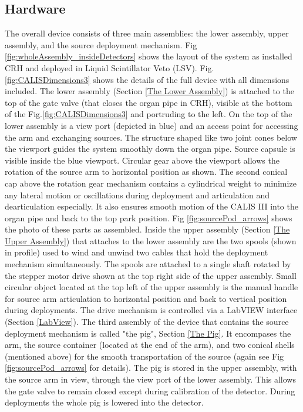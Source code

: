 \subsection{Hardware}

The overall device consists of three main assemblies: the lower assembly, upper assembly, and the source deployment mechanism. Fig \ref{fig:wholeAssembly_insideDetectors} shows the layout of the system as installed CRH and deployed in Liquid Scintillator Veto (LSV). Fig. \ref{fig:CALISDimensions3} shows the details of the full device with all dimensions included. The lower assembly (Section \ref{The Lower Assembly}) is attached to the top of the gate valve (that closes the organ pipe in CRH), visible at the bottom of the Fig.\ref{fig:CALISDimensions3} and portruding to the left. On the top of the lower  assembly is a view port  (depicted in blue) and an access point for accessing the arm and exchanging sources. The structure shaped like two joint cones below the viewport guides the system smoothly down the organ pipe. Source capsule is visible inside the blue viewport. Circular gear above the viewport allows the rotation of the source arm to horizontal position as shown. The second conical cap above the rotation gear mechanism contains a cylindrical weight to minimize any lateral motion or oscillations during deployment and articulation and dearticulation especially. It also ensures smooth motion of the CALIS III into the organ pipe and back to the top park position. Fig \ref{fig:sourcePod_arrows} shows the photo of these parts as assembled. Inside the upper assembly (Section \ref{The Upper Assembly}) that attaches to the lower assembly are the two spools (shown in profile) used to wind and unwind two cables that hold the deployment mechanism simultaneously. The spools are attached to a single shaft rotated by the stepper motor drive shown at the top right side of the upper assembly. Small circular object located at the top left of the upper assembly is the manual handle for source arm articulation to horizontal position and back to vertical position during deployments.  The drive mechanism is controlled via a LabVIEW interface (Section \ref{LabView}).  The third assembly of the device that contains the source deployment mechanism is called "the pig", Section \ref{The Pig}. It encompases the arm, the source container (located at the end of the arm), and two conical shells (mentioned above) for the smooth transportation of the source  (again see Fig \ref{fig:sourcePod_arrows} for details). The pig is stored in the upper assembly, with the source arm in view, through the view port of the lower assembly. This allows the gate valve to remain closed except during calibration of the detector. During deployments the whole pig is lowered into the detector. 


